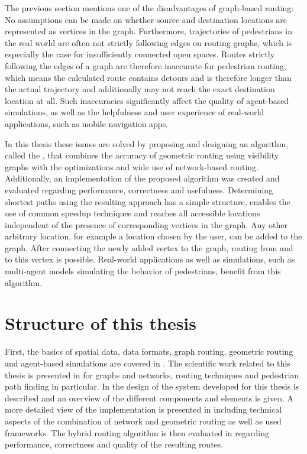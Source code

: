 	The previous section mentions one of the disadvantages of graph-based routing:
	No assumptions can be made on whether source and destination locations are represented as vertices in the graph.
	Furthermore, trajectories of pedestrians in the real world are often not strictly following edges on routing graphs, which is especially the case for insufficiently connected open spaces.
	Routes strictly following the edges of a graph are therefore inaccurate for pedestrian routing\cite{graser-osm-open-spaces}, which means the calculated route contains detours and is therefore longer than the actual trajectory and additionally may not reach the exact destination location at all.
	Such inaccuracies significantly affect the quality of agent-based simulations, as well as the helpfulness and user experience of real-world applications, such as mobile navigation apps.

	In this thesis these issues are solved by proposing and designing an algorithm, called the , that combines the accuracy of geometric routing using visibility graphs with the optimizations and wide use of network-based routing.
	Additionally, an implementation of the proposed algorithm was created and evaluated regarding performance, correctness and usefulness.
	Determining shortest paths using the resulting approach has a simple structure, enables the use of common speedup techniques and reaches all accessible locations independent of the presence of corresponding vertices in the graph.
	Any other arbitrary location, for example a location chosen by the user, can be added to the graph.
	After connecting the newly added vertex to the graph, routing from and to this vertex is possible.
	Real-world applications as well as simulations, such as multi-agent models simulating the behavior of pedestrians, benefit from this algorithm.
	
\section{Structure of this thesis}

	First, the basics of spatial data, data formats, graph routing, geometric routing and agent-based simulations are covered in .
	The scientific work related to this thesis is presented in  for graphs and networks, routing techniques and pedestrian path finding in particular.
	In  the design of the system developed for this thesis is described and an overview of the different components and elements is given.
	A more detailed view of the implementation is presented in  including technical aspects of the combination of network and geometric routing as well as used frameworks.
	The hybrid routing algorithm is then evaluated in  regarding performance, correctness and quality of the resulting routes.